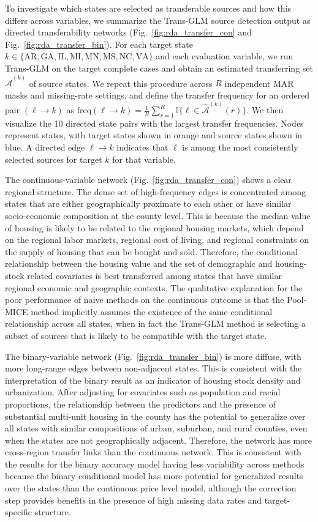 \documentclass[12pt]{article}
\begin{document}
To investigate which states are selected as transferable sources and how this differs across variables, we summarize the Trans-GLM source detection output as directed transferability networks (Fig.~\ref{fig:rda_transfer_con} and Fig.~\ref{fig:rda_transfer_bin}). For each target state $k\in\{\mathrm{AR,GA,IL,MI,MN,MS,NC,VA}\}$ and each evaluation variable, we run Trans-GLM on the target complete cases and obtain an estimated transferring set $\widehat{\mathcal{A}}^{(k)}$ of source states. We repeat this procedure across $R$ independent MAR masks and missing-rate settings, and define the transfer frequency for an ordered pair $(\ell\rightarrow k)$ as
\(\mathrm{freq}(\ell\rightarrow k)
=\frac{1}{R}\sum_{r=1}^{R}\mathbb{I}\{\ell\in\widehat{\mathcal{A}}^{(k)}(r)\}.\)
We then visualize the 10 directed state pairs with the largest transfer frequencies. Nodes represent states, with target states shown in orange and source states shown in blue. A directed edge $\ell\rightarrow k$ indicates that $\ell$ is among the most consistently selected sources for target $k$ for that variable.

The continuous-variable network (Fig.~\ref{fig:rda_transfer_con}) shows a clear regional structure. The dense set of high-frequency edges is concentrated among states that are either geographically proximate to each other or have similar socio-economic composition at the county level. This is because the median value of housing is likely to be related to the regional housing markets, which depend on the regional labor markets, regional cost of living, and regional constraints on the supply of housing that can be bought and sold. Therefore, the conditional relationship between the housing value and the set of demographic and housing-stock related covariates is best transferred among states that have similar regional economic and geographic contexts. The qualitative explanation for the poor performance of naive methods on the continuous outcome is that the Pool-MICE method implicitly assumes the existence of the same conditional relationship across all states, when in fact the Trans-GLM method is selecting a subset of sources that is likely to be compatible with the target state.

The binary-variable network (Fig.~\ref{fig:rda_transfer_bin}) is more diffuse, with more long-range edges between non-adjacent states. This is consistent with the interpretation of the binary result as an indicator of housing stock density and urbanization. After adjusting for covariates such as population and racial proportions, the relationship between the predictors and the presence of substantial multi-unit housing in the county has the potential to generalize over all states with similar compositions of urban, suburban, and rural counties, even when the states are not geographically adjacent. Therefore, the network has more cross-region transfer links than the continuous network. This is consistent with the results for the binary accuracy model having less variability across methods because the binary conditional model has more potential for generalized results over the states than the continuous price level model, although the correction step provides benefits in the presence of high missing data rates and target-specific structure.
\end{document}
